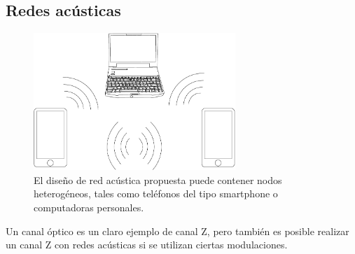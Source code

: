 
\subsection{Redes acústicas}
\begin{figure}[!t]
  \centering
    \includegraphics[width=3in]{graphs/compucelus.pdf}
    \caption{El diseño de red acústica propuesta puede contener nodos heterogéneos, tales como teléfonos del tipo smartphone o computadoras personales.}
    \label{arch:chain}
\end{figure}

Un canal óptico es un claro ejemplo de canal Z, pero también es posible realizar un canal Z con redes acústicas si se utilizan ciertas modulaciones.

